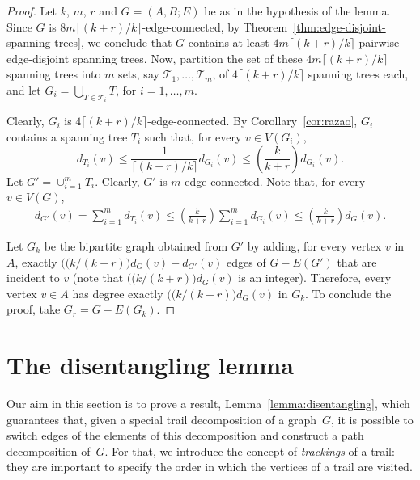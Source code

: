 \documentclass[12pt,reqno,a4paper]{amsart}
\begin{document}
\begin{proof}
Let $k$, $m$, $r$ and $G=(A,B;E)$ be as in the hypothesis of the
lemma. Since \(G\)
is \(8m\lceil(k+r)/k\rceil\)-edge-connected,
by Theorem~\ref{thm:edge-disjoint-spanning-trees}, we conclude that
\(G\)
contains at least \(4m\lceil(k+r)/k\rceil\)
pairwise edge-disjoint spanning trees.  Now, partition the set of 
  these
\(4m\lceil(k+r)/k\rceil\)
spanning trees into \(m\)
sets, say \(\mathcal{T}_1,\ldots,\mathcal{T}_m\),
of $4\lceil(k+r)/k\rceil$ spanning trees each,  and let \(G_i =
\bigcup_{T\in \mathcal{T}_i} T\), for \(i = 1,\ldots,m\).

Clearly, \(G_i\)
is $4\lceil(k+r)/k\rceil$-edge-connected.  By
Corollary~\ref{cor:razao}, \(G_i\)
contains a spanning tree \(T_i\) such that, for every $v\in V(G_i)$,
\[
	d_{T_i}(v) \leq \frac{1}{\lceil(k+r)/k\rceil} d_{G_i}(v) \leq 
\left(\frac{k}{k+r}\right)d_{G_i}(v).
\]
Let \(G' = \cup_{i=1}^m T_i\). Clearly, \(G'\) is \(m\)-edge-connected. Note 
that, for every $v\in V(G)$,
\begin{align*}
	d_{G'}(v) = \sum_{i=1}^m d_{T_i}(v) \leq \left(\frac{k}{k+r}\right) \sum_{i=1}^m 
d_{G_i}(v) \leq \left(\frac{k}{k+r}\right)d_G(v).
\end{align*}

Let $G_k$ be the bipartite graph obtained from $G'$ by adding,
for every vertex $v$ in $A$, exactly $\big((k/(k+r)\big)d_G(v) - d_{G'}(v)$
edges of $G-E(G')$ that are incident to $v$ (note that
$\big((k/(k+r)\big)d_G(v)$ is an integer). Therefore, every vertex
$v\in A$ has degree exactly $\big((k/(k+r)\big)d_G(v)$ in $G_k$. To
conclude the proof, take \(G_r = G - E(G_k)\).
\end{proof}


\section{The disentangling lemma}\label{section:disentangling}


Our aim in this section is to prove a result,
  Lemma~\ref{lemma:disentangling}, which guarantees that, given a
  special trail decomposition of a graph~$G$, it is possible to switch
  edges of the elements of this decomposition and construct a path
  decomposition of~$G$. For that, we introduce the concept of
  \emph{trackings} of a trail: they are important to specify the order
  in which the vertices of a trail are visited.
  
\end{document}
